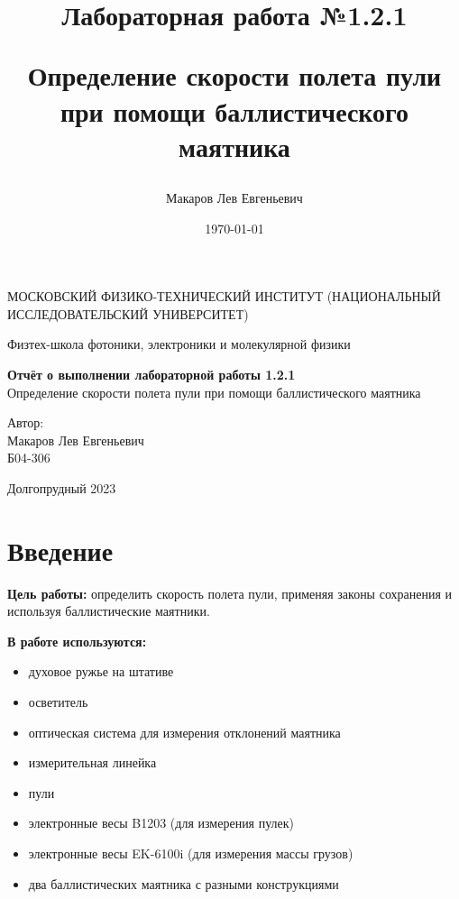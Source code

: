 \documentclass[a4paper,12pt]{article} %
\author{Макаров Лев Евгеньевич}
\title{Лабораторная работа №1.2.1

Определение скорости полета пули при помощи баллистического маятника
}
\date{\today}
\begin{document}
\begin{titlepage}
	\begin{center}
		{\large МОСКОВСКИЙ ФИЗИКО-ТЕХНИЧЕСКИЙ ИНСТИТУТ (НАЦИОНАЛЬНЫЙ ИССЛЕДОВАТЕЛЬСКИЙ УНИВЕРСИТЕТ)}
	\end{center}
	\begin{center}
		{\large Физтех-школа фотоники, электроники и молекулярной физики}
	\end{center}
	
	
	\vspace{4.5cm}
	{\huge
		\begin{center}
			{\bf Отчёт о выполнении лабораторной работы 1.2.1}\\
			Определение скорости полета пули при помощи баллистического маятника
		\end{center}
	}
	\vspace{2cm}
	\begin{flushright}
		{\LARGE Автор:\\ Макаров Лев Евгеньевич \\
			\vspace{0.2cm}
			Б04-306}
	\end{flushright}
	\vspace{8cm}
	\begin{center}
		Долгопрудный 2023
	\end{center}
\end{titlepage}

\section{Введение}

\textbf{Цель работы:} определить скорость полета пули, применяя законы сохранения и используя баллистические маятники.
\medskip

\textbf{В работе используются:} 
\begin{itemize}
    \item духовое ружье на штативе
    \item осветитель
    \item оптическая система для измерения отклонений маятника
    \item измерительная линейка
    \item пули
    \item электронные весы B1203 (для измерения пулек)
    \item электронные весы EK-6100i (для измерения массы грузов)
    \item два баллистических маятника с разными конструкциями
\end{itemize}
\medskip
\end{document}
